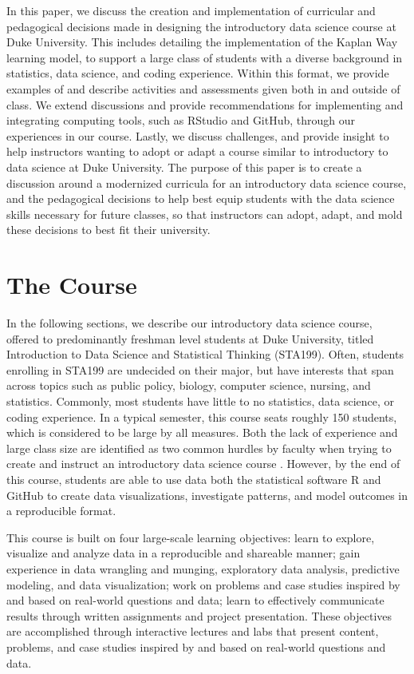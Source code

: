 \documentclass[
  12pt]{article}
\begin{document}
In this paper, we discuss the creation and implementation of curricular
and pedagogical decisions made in designing the introductory data
science course at Duke University. This includes detailing the
implementation of the Kaplan Way learning model, to support a large
class of students with a diverse background in statistics, data science,
and coding experience. Within this format, we provide examples of and
describe activities and assessments given both in and outside of class.
We extend discussions and provide recommendations for implementing and
integrating computing tools, such as RStudio and GitHub, through our
experiences in our course. Lastly, we discuss challenges, and provide
insight to help instructors wanting to adopt or adapt a course similar
to introductory to data science at Duke University. The purpose of this
paper is to create a discussion around a modernized curricula for an
introductory data science course, and the pedagogical decisions to help
best equip students with the data science skills necessary for future
classes, so that instructors can adopt, adapt, and mold these decisions
to best fit their university.

\hypertarget{sec-course}{%
\section{The Course}\label{sec-course}}

In the following sections, we describe our introductory data science
course, offered to predominantly freshman level students at Duke
University, titled Introduction to Data Science and Statistical Thinking
(STA199). Often, students enrolling in STA199 are undecided on their
major, but have interests that span across topics such as public policy,
biology, computer science, nursing, and statistics. Commonly, most
students have little to no statistics, data science, or coding
experience. In a typical semester, this course seats roughly 150
students, which is considered to be large by all measures. Both the lack
of experience and large class size are identified as two common hurdles
by faculty when trying to create and instruct an introductory data
science course \citep{Schwab2020, Kok_2008}. However, by the end of this
course, students are able to use data both the statistical software R
and GitHub to create data visualizations, investigate patterns, and
model outcomes in a reproducible format.

This course is built on four large-scale learning objectives: learn to
explore, visualize and analyze data in a reproducible and shareable
manner; gain experience in data wrangling and munging, exploratory data
analysis, predictive modeling, and data visualization; work on problems
and case studies inspired by and based on real-world questions and data;
learn to effectively communicate results through written assignments and
project presentation. These objectives are accomplished through
interactive lectures and labs that present content, problems, and case
studies inspired by and based on real-world questions and data.
\end{document}

